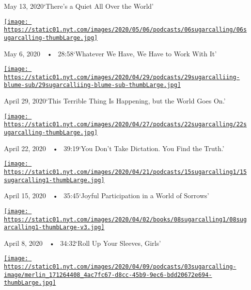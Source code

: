 May 13, 2020`There's a Quiet All Over the World'

\href{https://www.nytimes.com/2020/05/06/podcasts/sugar-calling-alice-walker-quarantine-virus.html?action=click\&module=audio-series-bar\&region=header\&pgtype=Article}{\texttt{[image: https://static01.nyt.com/images/2020/05/06/podcasts/06sugarcalling/06sugarcalling-thumbLarge.jpg]}}

May 6, 2020~~•~ 28:58`Whatever We Have, We Have to Work With It'

\href{https://www.nytimes.com/2020/04/29/podcasts/sugar-calling-judy-blume-quarantine-virus.html?action=click\&module=audio-series-bar\&region=header\&pgtype=Article}{\texttt{[image: https://static01.nyt.com/images/2020/04/29/podcasts/29sugarcalliing-blume-sub/29sugarcalliing-blume-sub-thumbLarge.jpg]}}

April 29, 2020`This Terrible Thing Is Happening, but the World Goes On.'

\href{https://www.nytimes.com/2020/04/22/podcasts/sugar-calling-amy-tan-quarantine-virus.html?action=click\&module=audio-series-bar\&region=header\&pgtype=Article}{\texttt{[image: https://static01.nyt.com/images/2020/04/27/podcasts/22sugarcalling/22sugarcalling-thumbLarge.jpg]}}

April 22, 2020~~•~ 39:19`You Don't Take Dictation. You Find the Truth.'

\href{https://www.nytimes.com/2020/04/15/podcasts/sugar-calling-pico-iyer-coronavirus.html?action=click\&module=audio-series-bar\&region=header\&pgtype=Article}{\texttt{[image: https://static01.nyt.com/images/2020/04/21/podcasts/15sugarcalling1/15sugarcalling1-thumbLarge.jpg]}}

April 15, 2020~~•~ 35:45`Joyful Participation in a World of Sorrows'

\href{https://www.nytimes.com/2020/04/08/podcasts/sugar-calling-margaret-atwood-coronavirus.html?action=click\&module=audio-series-bar\&region=header\&pgtype=Article}{\texttt{[image: https://static01.nyt.com/images/2020/04/02/books/08sugarcalling1/08sugarcalling1-thumbLarge-v3.jpg]}}

April 8, 2020~~•~ 34:32`Roll Up Your Sleeves, Girls'

\href{https://www.nytimes.com/2020/04/03/podcasts/sugar-calling-george-saunders-coronavirus.html?action=click\&module=audio-series-bar\&region=header\&pgtype=Article}{\texttt{[image: https://static01.nyt.com/images/2020/04/09/podcasts/03sugarcalling-image/merlin\_171264408\_4ac7fc67-d8cc-45b9-9ec6-bdd20672e694-thumbLarge.jpg]}}

